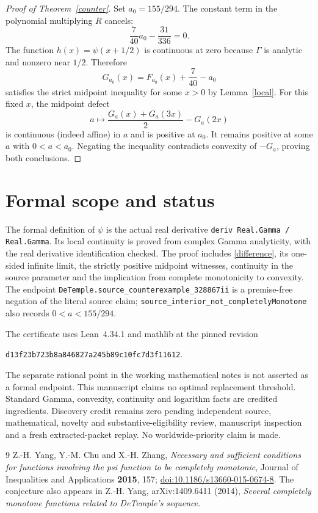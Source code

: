 \documentclass[11pt]{article}
\begin{document}
\begin{proof}[Proof of Theorem~\ref{counter}]
Set $a_0=155/294$. The constant term in the polynomial multiplying $R$ cancels:
\[
 \frac7{40}a_0-\frac{31}{336}=0.
\]
The function $h(x)=\psi(x+1/2)$ is continuous at zero because $\Gamma$ is
analytic and nonzero near $1/2$. Therefore
\[
 G_{a_0}(x)=F_{a_0}(x)+\frac7{40}-a_0
\]
satisfies the strict midpoint inequality for some $x>0$ by Lemma~\ref{local}.
For this fixed $x$, the midpoint defect
\[
 a\longmapsto\frac{G_a(x)+G_a(3x)}2-G_a(2x)
\]
is continuous (indeed affine) in $a$ and is positive at $a_0$. It remains positive
at some $a$ with $0<a<a_0$. Negating the inequality contradicts convexity of
$-G_a$, proving both conclusions.
\end{proof}

\section*{Formal scope and status}
The formal definition of $\psi$ is the actual real derivative
\texttt{deriv Real.Gamma / Real.Gamma}. Its local continuity is proved from
complex Gamma analyticity, with the real derivative identification checked.
The proof includes \eqref{difference}, its one-sided infinite limit, the
strictly positive midpoint witnesses, continuity in the source parameter and
the implication from complete monotonicity to convexity. The endpoint
\texttt{DeTemple.}\allowbreak\texttt{source\_counterexample\_328867ii} is a premise-free negation
of the literal source claim; \texttt{source\_interior\_not\_}\allowbreak\texttt{completelyMonotone}
also records $0<a<155/294$.

The certificate uses Lean~4.34.1 and mathlib at the pinned revision
\begin{center}
\texttt{d13f23b723b8a846827a245b89c10fc7d3f11612}.
\end{center}
The separate rational point in the working mathematical notes is not asserted
as a formal endpoint. This manuscript claims no optimal replacement threshold.
Standard Gamma, convexity, continuity and logarithm facts are credited
ingredients. Discovery credit remains zero pending independent source,
mathematical, novelty and substantive-eligibility review, manuscript inspection
and a fresh extracted-packet replay. No worldwide-priority claim is made.

\begin{thebibliography}{9}
 Z.-H. Yang, Y.-M. Chu and X.-H. Zhang,
\emph{Necessary and sufficient conditions for functions involving the psi
function to be completely monotonic}, Journal of Inequalities and Applications
\textbf{2015}, 157; \href{https://doi.org/10.1186/s13660-015-0674-8}{doi:10.1186/s13660-015-0674-8}.
The conjecture also appears in Z.-H. Yang, arXiv:1409.6411 (2014),
\emph{Several completely monotone functions related to DeTemple's sequence}.
\end{thebibliography}
\end{document}
